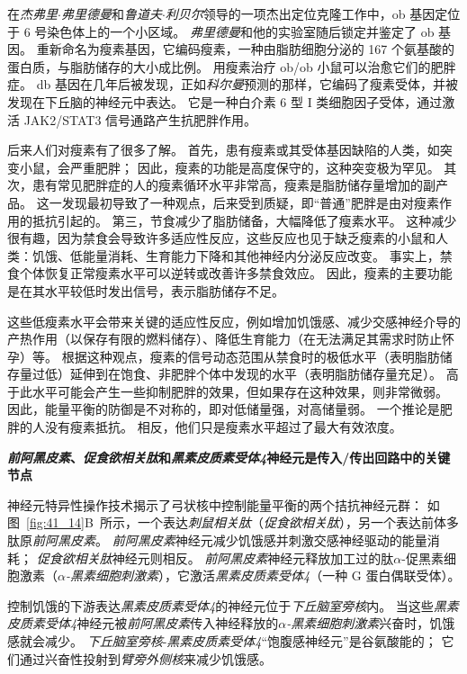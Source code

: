 在\textit{杰弗里$\cdot$弗里德曼}和\textit{鲁道夫$\cdot$利贝尔}领导的一项杰出定位克隆工作中，ob 基因定位于 6 号染色体上的一个小区域。
\textit{弗里德曼}和他的实验室随后锁定并鉴定了 ob 基因。
重新命名为瘦素基因，它编码瘦素，一种由脂肪细胞分泌的 167 个氨基酸的蛋白质，与脂肪储存的大小成比例。
用瘦素治疗 ob/ob 小鼠可以治愈它们的肥胖症。
db 基因在几年后被发现，正如\textit{科尔曼}预测的那样，它编码了瘦素受体，并被发现在下丘脑的神经元中表达。
它是一种白介素 6 型 I 类细胞因子受体，通过激活 JAK2/STAT3 信号通路产生抗肥胖作用。


后来人们对瘦素有了很多了解。
首先，患有瘦素或其受体基因缺陷的人类，如突变小鼠，会严重肥胖；
因此，瘦素的功能是高度保守的，这种突变极为罕见。
其次，患有常见肥胖症的人的瘦素循环水平非常高，瘦素是脂肪储存量增加的副产品。
这一发现最初导致了一种观点，后来受到质疑，即“普通”肥胖是由对瘦素作用的抵抗引起的。
第三，节食减少了脂肪储备，大幅降低了瘦素水平。
这种减少很有趣，因为禁食会导致许多适应性反应，这些反应也见于缺乏瘦素的小鼠和人类：饥饿、低能量消耗、生育能力下降和其他神经内分泌反应改变。
事实上，禁食个体恢复正常瘦素水平可以逆转或改善许多禁食效应。
因此，瘦素的主要功能是在其水平较低时发出信号，表示脂肪储存不足。


这些低瘦素水平会带来关键的适应性反应，例如增加饥饿感、减少交感神经介导的产热作用（以保存有限的燃料储存）、降低生育能力（在无法满足其需求时防止怀孕）等。
根据这种观点，瘦素的信号动态范围从禁食时的极低水平（表明脂肪储存量过低）延伸到在饱食、非肥胖个体中发现的水平（表明脂肪储存量充足）。
高于此水平可能会产生一些抑制肥胖的效果，但如果存在这种效果，则非常微弱。
因此，能量平衡的防御是不对称的，即对低储量强，对高储量弱。
一个推论是肥胖的人没有瘦素抵抗。
相反，他们只是瘦素水平超过了最大有效浓度。


\textbf{\textit{前阿黑皮素}、\textit{促食欲相关肽}和\textit{黑素皮质素受体4}神经元是传入/传出回路中的关键节点}

神经元特异性操作技术揭示了弓状核中控制能量平衡的两个拮抗神经元群：
如图~\ref{fig:41_14}B~所示，一个表达\textit{刺鼠相关肽}（\textit{促食欲相关肽}），另一个表达前体多肽原\textit{前阿黑皮素}。
\textit{前阿黑皮素}神经元减少饥饿感并刺激交感神经驱动的能量消耗；
\textit{促食欲相关肽}神经元则相反。
\textit{前阿黑皮素}神经元释放加工过的肽$\alpha$-促黑素细胞激素（\textit{$\alpha$-黑素细胞刺激素}），它激活\textit{黑素皮质素受体4}（一种 G 蛋白偶联受体）。


控制饥饿的下游表达\textit{黑素皮质素受体4}的神经元位于\textit{下丘脑室旁核}内。
当这些\textit{黑素皮质素受体4}神经元被\textit{前阿黑皮素}传入神经释放的\textit{$\alpha$-黑素细胞刺激素}兴奋时，饥饿感就会减少。
\textit{下丘脑室旁核}-\textit{黑素皮质素受体4}“饱腹感神经元”是谷氨酸能的；
它们通过兴奋性投射到\textit{臂旁外侧核}来减少饥饿感。


